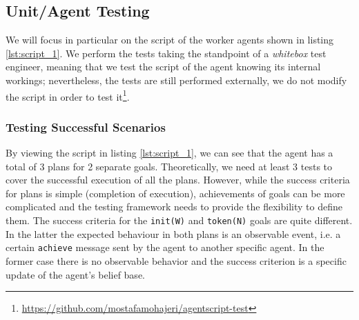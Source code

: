 
 

\subsection{Unit/Agent Testing}
We will focus in particular on the script of the worker agents shown in listing \ref{lst:script_1}. We perform the tests taking the standpoint of a \textit{whitebox} test engineer, meaning that we test the script of the agent knowing its internal workings; nevertheless, the tests are still performed externally, we do not modify the script in order to test it\footnote{\url{https://github.com/mostafamohajeri/agentscript-test}}.

\subsubsection{Testing Successful Scenarios}
By viewing the script in listing \ref{lst:script_1}, we can see that the agent has a total of 3 plans for 2 separate goals. Theoretically, we need at least 3 tests to cover the successful execution of all the plans. However, while the success criteria for plans is simple (completion of execution), achievements of goals can be more complicated and the testing framework needs to provide the flexibility to define them. The success criteria for the \texttt{init(W)} and \texttt{token(N)} goals are quite different. In the latter the expected behaviour in both plans is an observable event, i.e. a certain \texttt{achieve} message sent by the agent to another specific agent. In the former case there is no observable behavior and the success criterion is a specific update of the agent's belief base.





